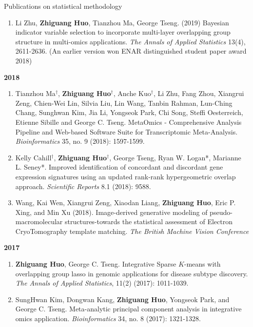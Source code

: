 \documentclass{resume} %
\begin{document}
\begin{rSection}{Publications on statistical methodology}
\begin{enumerate}[noitemsep,topsep=0pt,resume]
\item Li Zhu, {\bf  Zhiguang Huo}, Tianzhou Ma, George Tseng. (2019)
Bayesian indicator variable selection to incorporate multi-layer overlapping group structure in multi-omics applications. 
\emph{The Annals of Applied Statistics} 13(4), 2611-2636. 
(An earlier version won ENAR distinguished student paper award 2018)

\end{enumerate}


\textbf{2018}
\begin{enumerate}[noitemsep,topsep=0pt, resume]

\item Tianzhou Ma$^\dagger$, {\bf  Zhiguang Huo$^\dagger$}, Anche Kuo$^\dagger$, Li Zhu, Fang Zhou, Xiangrui Zeng, Chien-Wei Lin, Silvia Liu, Lin Wang, Tanbin Rahman, Lun-Ching Chang, Sunghwan Kim, Jia Li, Yongseok Park, Chi Song, Steffi Oesterreich, Etienne Sibille and George C. Tseng. 
MetaOmics - Comprehensive Analysis Pipeline and Web-based Software Suite for Transcriptomic Meta-Analysis. \emph{Bioinformatics} 35, no. 9 (2018): 1597-1599. 

\item Kelly Cahill$^\dagger$, {\bf  Zhiguang Huo$^\dagger$}, George Tseng, Ryan W. Logan*, Marianne L. Seney*.
Improved identification of concordant and discordant gene expression signatures using an updated rank-rank hypergeometric overlap approach. \emph{Scientific Reports} 8.1 (2018): 9588.

\item 
Wang, Kai Wen, Xiangrui Zeng, Xiaodan Liang, {\bf Zhiguang Huo}, Eric P. Xing, and Min Xu (2018). Image-derived generative modeling of pseudo-macromolecular structures-towards the statistical assessment of Electron CryoTomography template matching. \emph{The British Machine Vision Conference}

\end{enumerate}

\textbf{2017}
\begin{enumerate}[noitemsep,topsep=0pt, resume]

\item {\bf Zhiguang Huo}, George C. Tseng. 
    Integrative Sparse $K$-means with overlapping group lasso in genomic applications for disease subtype discovery.
    \emph{The Annals of Applied Statistics}, 11(2) (2017): 1011-1039.

\item 
SungHwan Kim, Dongwan Kang, {\bf Zhiguang Huo}, Yongseok Park, and George C. Tseng. 
Meta-analytic principal component analysis in integrative omics application. 
\emph{Bioinformatics} 34, no. 8 (2017): 1321-1328.


\end{enumerate}
\end{rSection}
\end{document}
